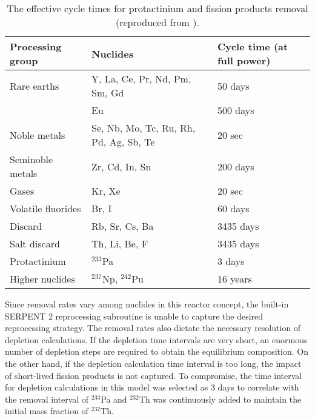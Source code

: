 \begin{table}[ht!]
        \centering
        \caption{The effective cycle times for protactinium and fission products removal (reproduced from \cite{robertson_conceptual_1971}).}
        \begin{tabular}{|m{} | m{}|m{}|}
        \hline 
        Processing group & \qquad\qquad\qquad Nuclides & Cycle time (at full power) \\ [5pt] \hline 
        Rare earths & Y, La, Ce, Pr, Nd, Pm, Sm, Gd & 50 days \\ [5pt] \hline 
        \qquad & Eu & 500 days \\ [5pt] \hline
        Noble metals & Se, Nb, Mo, Tc, Ru, Rh, Pd, Ag, Sb, Te & 20 sec \\ [5pt] \hline
        Seminoble metals & Zr, Cd, In, Sn & 200 days \\ [5pt] \hline
        Gases & Kr, Xe & 20 sec \\ [5pt] \hline
        Volatile fluorides & Br, I & 60 days \\ [5pt] \hline
        Discard & Rb, Sr, Cs, Ba & 3435 days \\ [5pt] \hline
        Salt discard & Th, Li, Be, F & 3435 days \\ [5pt] \hline
        Protactinium & $^{233}$Pa & 3 days \\ [5pt] \hline
        Higher nuclides & $^{237}$Np, $^{242}$Pu & 16 years \\ [5pt] \hline
        \end{tabular}
        \label{tab:reprocessing_list}
          \vspace{-0.9em}
\end{table}
Since removal rates vary among nuclides in this reactor concept, the built-in SERPENT 2 reprocessing subroutine is unable to capture the desired reprocessing strategy. The removal rates also dictate the necessary resolution of depletion calculations. If the depletion time intervals are very short, an enormous number of depletion steps are required to obtain the equilibrium composition. On the other hand, if the depletion  calculation time interval is too long, the impact of short-lived fission products is not captured. To compromise, the time interval for depletion calculations in this model was selected as 3 days to correlate with the removal interval of $^{233}$Pa and $^{232}$Th was continuously added to maintain the initial mass fraction of $^{232}$Th.

